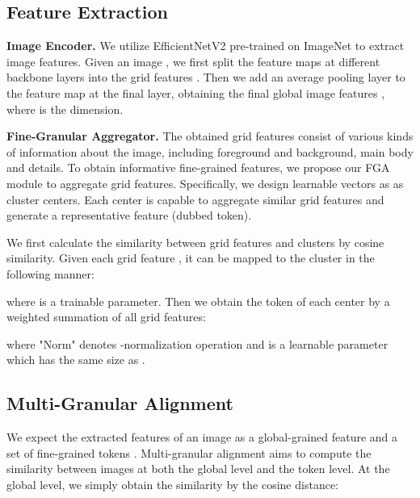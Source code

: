 \documentclass[10pt,twocolumn,letterpaper]{article}
\begin{document}
\subsection{Feature Extraction}
\label{2.1}
\par \textbf{Image Encoder.} We utilize EfficientNetV2 \cite{effecientnetv2} pre-trained on ImageNet \cite{imagenet} to extract image features. Given an image , we first split the feature maps  at different backbone layers into the grid features . Then we add an average pooling layer to the feature map at the final layer, obtaining the final global image features , where  is the dimension.



\par \textbf{Fine-Granular Aggregator.}
The obtained grid features consist of various kinds of information about the image, including foreground and background, main body and details. To obtain informative fine-grained features, we propose our FGA module to aggregate grid features. Specifically, we design  learnable vectors as  as cluster centers. Each center is capable to aggregate similar grid features and generate a representative feature (dubbed token). 

We first calculate the similarity between grid features  and clusters  by cosine similarity. Given each grid feature , it can be mapped to the  cluster in the following manner:

where  is a trainable parameter. Then we obtain the token  of each center by a weighted summation of all grid features:  

where "Norm" denotes -normalization operation and  is a learnable parameter which has the same size as . 

\subsection{Multi-Granular Alignment}
\label{2.2}
We expect the extracted features of an image as a global-grained feature  and a set of fine-grained tokens  . Multi-granular alignment aims to compute the similarity between images at both the global level and the token level. At the global level, we simply obtain the similarity by the cosine distance:
\end{document}
